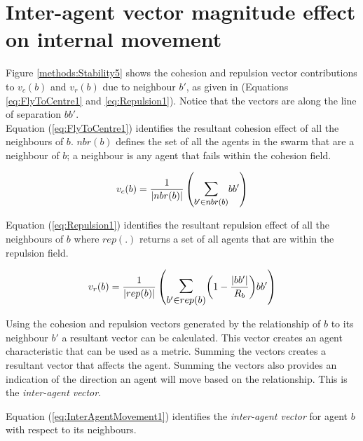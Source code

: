 \documentclass{ieeeaccess}
\begin{document}
\section{Inter-agent vector magnitude effect on internal movement}\label{Section:StabilityMagnitude}
Figure \ref{methods:Stability5} shows the cohesion and repulsion vector contributions to $v_c(b)$ and $v_r(b)$ due to neighbour $b'$, as given in (Equations \ref{eq:FlyToCentre1} and \ref{eq:Repulsion1}). Notice that the vectors are along the line of separation $bb'$. \\


Equation (\ref{eq:FlyToCentre1}) identifies the resultant cohesion effect of all the neighbours of $b$. $nbr(b)$ defines the set of all the agents in the swarm that are a neighbour of $b$; a neighbour is any agent that fails within the cohesion field.

\begin{equation}\label{eq:FlyToCentre1}
v_{c}(b) = \frac{1}{|nbr(b)|}\left({\mathlarger{\sum_{b' \in nbr(b)}}{bb'}}\right)
\end{equation}

Equation (\ref{eq:Repulsion1}) identifies the resultant repulsion effect of all the neighbours of $b$ where $rep(.)$ returns a set of all agents that are within the repulsion field.

\begin{equation}
\label{eq:Repulsion1}
v_{r}(b) = 
\frac{1}{|rep(b)|}
\left(
\mathlarger{\mathlarger{\sum_{b' \in rep(b)}}}
{\left( 1-\frac{|bb'|}{R_b} \right)}
{bb'}
\right)
\end{equation}

Using the cohesion and repulsion vectors generated by the relationship of $b$ to its neighbour $b'$ a resultant vector can be calculated. This vector creates an agent characteristic that can be used as a metric. Summing the vectors creates a resultant vector that affects the agent. Summing the vectors also provides an indication of the direction an agent will move based on the relationship. This is the \emph{inter-agent vector}.

Equation (\ref{eq:InterAgentMovement1}) identifies the \emph{inter-agent vector} for agent $b$ with respect to its neighbours.
\end{document}
